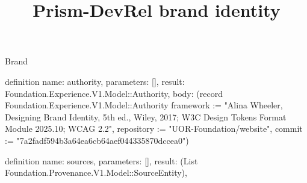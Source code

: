 \begin{lexlean}{Brand}
\title{Prism-DevRel brand identity}
\begin{semanticmodule}
definition{
  name: authority,
  parameters: [],
  result: Foundation.Experience.V1.Model::Authority,
  body: (record Foundation.Experience.V1.Model::Authority {framework := "Alina Wheeler, Designing Brand Identity, 5th ed., Wiley, 2017; W3C Design Tokens Format Module 2025.10; WCAG 2.2", repository := "UOR-Foundation/website", commit := "7a2fadf594b3a64ea6cb64aef044335870dccea0"})
}

definition{
  name: sources,
  parameters: [],
  result: (List Foundation.Provenance.V1.Model::SourceEntity),
}
\end{semanticmodule}
\end{lexlean}
